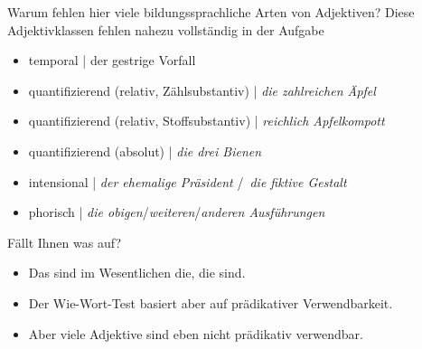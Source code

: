 \begin{frame}
  {Warum fehlen hier viele bildungssprachliche Arten von Adjektiven?}
  \onslide<+->
  \onslide<+->
  \small
  Diese Adjektivklassen fehlen nahezu vollständig in der Aufgabe
  \Halbzeile
  \begin{itemize}[<+->]
    \item \alert{temporal} | der \alert{gestrige} Vorfall
    \item \alert{quantifizierend} (relativ, Zählsubstantiv) | \textit{die \alert{zahlreichen} Äpfel}
    \item \alert{quantifizierend} (relativ, Stoffsubstantiv) | \textit{\alert{reichlich} Apfelkompott}
    \item \alert{quantifizierend} (absolut) | \textit{die \alert{drei} Bienen}
    \item \alert{intensional} | \textit{der \alert{ehemalige} Präsident} \slash\ \textit{die \alert{fiktive} Gestalt}
    \item \alert{phorisch} | \textit{die \alert{obigen}}/\textit{\alert{weiteren}}/\textit{\alert{anderen} Ausführungen}
  \end{itemize}
  \Halbzeile
  \onslide<+->
  Fällt Ihnen was auf?
  \begin{itemize}[<+->]
    \item Das sind im Wesentlichen die, die  sind.
    \item Der Wie-Wort-Test basiert aber auf prädikativer Verwendbarkeit.
    \item Aber viele Adjektive sind eben nicht prädikativ verwendbar. 
  \end{itemize}
\end{frame}



